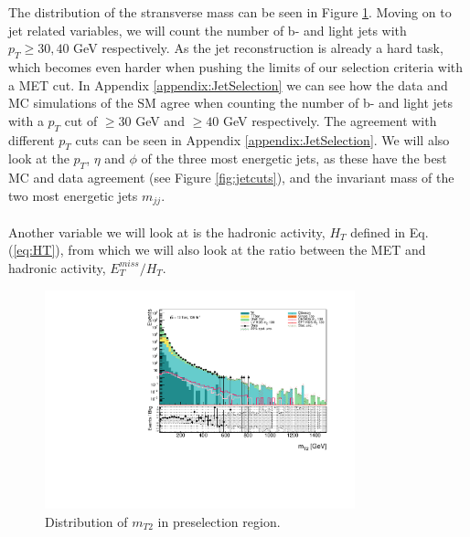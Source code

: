 \documentclass[12pt, a4paper]{book}
\begin{document}
The distribution of the stransverse mass can be seen in Figure \ref{fig:mt2_dist}. Moving on to jet related variables, we will count the number of b- and light jets with $p_T \ge 30, 40$ GeV respectively. As the jet reconstruction is already a hard task, 
which becomes even harder when pushing the limits of our selection criteria with a MET cut. In Appendix \ref{appendix:JetSelection} we can see how the data and MC simulations of the SM agree when counting the number of b- and light jets with a $p_T$ cut of $\ge30$ GeV and $\ge40$ GeV respectively. 
The agreement with different $p_T$ cuts can be seen in Appendix \ref{appendix:JetSelection}. We will also look at the $p_T$, $\eta$ and $\phi$ of the three most energetic jets, as these have the best MC and data agreement 
(see Figure \ref{fig:jetcuts}), and the invariant mass of the two most energetic jets $m_{jj}$.\\ 
\\Another variable we will look at is the hadronic activity, $H_T$ defined in Eq. (\ref{eq:HT}), from which we will also look at the ratio between the MET and hadronic activity, $E_T^{miss}/H_T$.\\
\begin{figure}[!ht]
    \centering
        \includegraphics[width=0.8\textwidth]{mt2.pdf}
    \caption{Distribution of $m_{T2}$ in preselection region.}\label{fig:mt2_dist}
\end{figure}
\end{document}
